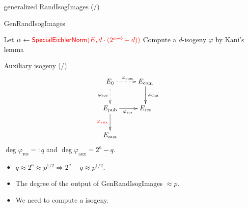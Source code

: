\begin{frame}{generalized RandIsogImages (/\genRIItotal{})}
    \begin{algorithm}[H]
        \caption{\textsf{GenRandIsogImages}}
        \BlankLine
        Let $\alpha \leftarrow \textcolor{red}{\textsf{SpecialEichlerNorm}(E, d\cdot(2^{a+b} - d))}$\;
        Compute a $d$-isogeny $\varphi$ by Kani's lemma\;
        \Return{$\varphi$}\;
    \end{algorithm}
\end{frame}

\newcommand*{\auxRIItotal}{\total{auxRIIcnt}}
\begin{frame}{Auxiliary isogeny (/\auxRIItotal{})}
    \vspace{-10pt}
    $$
    \xymatrix{
        E_0 \ar@{..>}[r]^{\varphi_\mathrm{com}} \ar@{..>}[d]_{\varphi_\mathrm{sec}} & E_\mathrm{com} \ar[d]^{\varphi_\mathrm{cha}} \\
        E_\mathrm{pub} \ar[r]_{\varphi_\mathrm{res}} \ar[d]_{\red{\varphi_\mathrm{aux}}} & E_\mathrm{res}\\
        E_\mathrm{aux} & 
    }
    $$
    $\deg\varphi_\mathrm{res} =: q$ and $\deg\varphi_\mathrm{aux} = 2^a - q$.

    \vspace*{10pt}
    \begin{itemize}
        \item $q \approx 2^a \approx p^{1/2} \Rightarrow 2^a - q \approx p^{1/2}$.
        \item The degree of the output of \textsf{GenRandIsogImages} $\approx p$.
        \item We need to compute a  isogeny.
    \end{itemize}
\end{frame}

